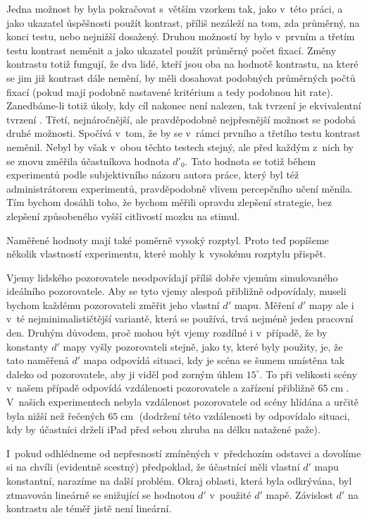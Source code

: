 Jedna možnost by byla pokračovat s~větším vzorkem tak, jako v~této
práci, a jako ukazatel úspěšnosti použít kontrast, příliš nezáleží na tom, zda
průměrný, na konci testu, nebo nejnižší dosažený. Druhou možností by bylo
v~prvním a třetím testu kontrast neměnit a jako ukazatel použít průměrný počet
fixací. Změny kontrastu totiž fungují, že dva lidé, kteří jsou oba
na hodnotě kontrastu, na které se jim již kontrast dále nemění, by měli dosahovat
podobných průměrných počtů fixací (pokud mají podobně nastavené kritérium a
tedy podobnou hit rate). Zanedbáme-li totiž úkoly, kdy cíl nakonec není
nalezen, tak tvrzení  je
ekvivalentní tvrzení . Třetí, nejnáročnější, ale pravděpodobně nejpřesnější možnost se 
podobá druhé možnosti. Spočívá v~tom, že by se v~rámci prvního a třetího
testu kontrast neměnil. Nebyl by však v~obou těchto testech stejný, ale před
každým z~nich by se znovu změřila účastníkova hodnota $d'_0$. Tato hodnota se
totiž během experimentů podle subjektivního názoru autora práce, který byl též
administrátorem experimentů, pravděpodobně vlivem percepčního učení měnila. Tím
bychom dosáhli toho, že bychom měřili opravdu zlepšení strategie, bez zlepšení
způsobeného vyšší citlivostí mozku na stimul.

Naměřené hodnoty mají také poměrně vysoký rozptyl. Proto teď popíšeme několik vlastností
experimentu, které mohly k~vysokému rozptylu přispět.

Vjemy lidského pozorovatele neodpovídají příliš dobře vjemům simulovaného
ideálního pozorovatele. Aby se tyto vjemy alespoň přibližně odpovídaly, museli
bychom každému pozorovateli změřit jeho vlastní $d'$ mapu. Měření $d'$ mapy ale
i  v~té nejminimalističtější variantě, která se používá, trvá nejméně jeden
pracovní den. Druhým důvodem, proč mohou být vjemy rozdílné i v~případě, že by
konstanty $d'$ mapy vyšly pozorovateli stejně, jako ty, které byly použity, je, že tato
naměřená $d'$ mapa odpovídá situaci, kdy je scéna se šumem umístěna tak daleko
od pozorovatele, aby ji viděl pod zorným úhlem $15^\circ$. To při velikosti
scény v~našem případě odpovídá vzdálenosti pozorovatele a zařízení přibližně
$65 \operatorname{cm}$. V~našich experimentech nebyla vzdálenost pozorovatele od
scény hlídána a určitě byla nižší než řečených $65 \operatorname{cm}$
(dodržení této vzdálenosti by odpovídalo situaci, kdy by účastníci drželi iPad
před sebou zhruba na délku natažené paže). 

I~pokud odhlédneme od nepřesností zmíněných v~předchozím odstavci a dovolíme
si na chvíli (evidentně scestný) předpoklad, že účastnící měli vlastní $d'$ mapu
konstantní, narazíme na další problém. Okraj oblasti, která byla odkrývána,
byl ztmavován lineárně se snižující se hodnotou $d'$ v~použité $d'$ mapě.
Závislost $d'$ na kontrastu ale téměř jistě
není lineární.

